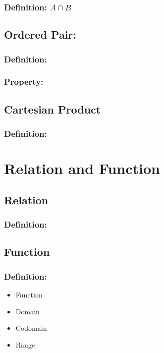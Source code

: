 \documentclass{article}
\begin{document}
\subsubsection{Definition: $A \cap B$}
\vspace{30px}
\subsection{Ordered Pair:}

\subsubsection{Definition:}
\vspace{20px}

\subsubsection{Property:}
\vspace{30px}

\subsection{Cartesian Product}

\subsubsection{Definition:}
\vspace{30px}

\pagebreak
\section{Relation and Function}
\subsection{Relation}
\subsubsection{Definition:}
\vspace{30px}
\subsection{Function}
\subsubsection{Definition:}
\begin{itemize}
    \item Function
    \item Domain
    \item Codomain
    \item Range
\end{itemize}
\end{document}
